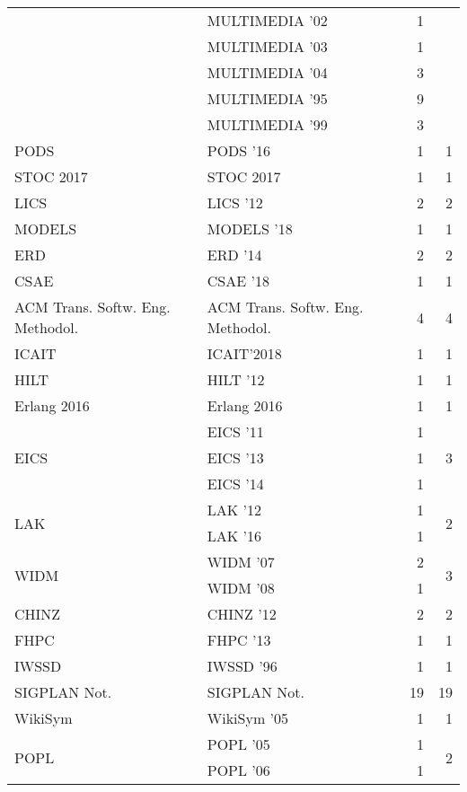 \begin{table*}[t]
\begin{tabular}{llrr}
& MULTIMEDIA '02 & 1 &\\
& MULTIMEDIA '03 & 1 &\\
& MULTIMEDIA '04 & 3 &\\
& MULTIMEDIA '95 & 9 &\\
& MULTIMEDIA '99 & 3 &\\
\multirow{1}{*}{PODS } & PODS '16 & 1 & \multirow{1}{*}{1}\\
\multirow{1}{*}{STOC 2017} & STOC 2017 & 1 & \multirow{1}{*}{1}\\
\multirow{1}{*}{LICS } & LICS '12 & 2 & \multirow{1}{*}{2}\\
\multirow{1}{*}{MODELS } & MODELS '18 & 1 & \multirow{1}{*}{1}\\
\multirow{1}{*}{ERD } & ERD '14 & 2 & \multirow{1}{*}{2}\\
\multirow{1}{*}{CSAE } & CSAE '18 & 1 & \multirow{1}{*}{1}\\
\multirow{1}{*}{ACM Trans. Softw. Eng. Methodol.} & ACM Trans. Softw. Eng. Methodol. & 4 & \multirow{1}{*}{4}\\
\multirow{1}{*}{ICAIT} & ICAIT'2018 & 1 & \multirow{1}{*}{1}\\
\multirow{1}{*}{HILT } & HILT '12 & 1 & \multirow{1}{*}{1}\\
\multirow{1}{*}{Erlang 2016} & Erlang 2016 & 1 & \multirow{1}{*}{1}\\
\multirow{3}{*}{EICS } & EICS '11 & 1 & \multirow{3}{*}{3}\\
& EICS '13 & 1 &\\
& EICS '14 & 1 &\\
\multirow{2}{*}{LAK } & LAK '12 & 1 & \multirow{2}{*}{2}\\
& LAK '16 & 1 &\\
\multirow{2}{*}{WIDM } & WIDM '07 & 2 & \multirow{2}{*}{3}\\
& WIDM '08 & 1 &\\
\multirow{1}{*}{CHINZ } & CHINZ '12 & 2 & \multirow{1}{*}{2}\\
\multirow{1}{*}{FHPC } & FHPC '13 & 1 & \multirow{1}{*}{1}\\
\multirow{1}{*}{IWSSD } & IWSSD '96 & 1 & \multirow{1}{*}{1}\\
\multirow{1}{*}{SIGPLAN Not.} & SIGPLAN Not. & 19 & \multirow{1}{*}{19}\\
\multirow{1}{*}{WikiSym } & WikiSym '05 & 1 & \multirow{1}{*}{1}\\
\multirow{2}{*}{POPL } & POPL '05 & 1 & \multirow{2}{*}{2}\\
& POPL '06 & 1 &\\

\end{tabular}
\end{table*}
